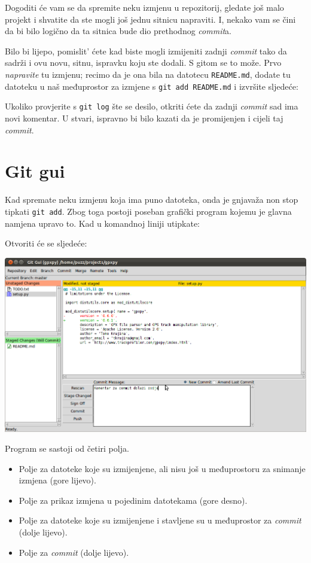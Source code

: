 Dogoditi će vam se da spremite neku izmjenu u repozitorij, gledate još malo projekt i shvatite da ste mogli još jednu sitnicu napraviti.
I, nekako vam se čini da bi bilo logično da ta sitnica bude dio prethodnog \emph{commit}a.

Bilo bi lijepo, pomislit' ćete kad biste mogli izmijeniti zadnji \emph{commit} tako da sadrži i ovu novu, sitnu, ispravku koju ste dodali.
S gitom se to može.
Prvo \emph{napravite} tu izmjenu; recimo da je ona bila na datotecu \verb+README.md+, dodate tu datoteku u naš međuprostor za izmjene s \verb+git add README.md+ i izvršite sljedeće:


Ukoliko provjerite s \verb+git log+ šte se desilo, otkriti ćete da zadnji \emph{commit} sad ima novi komentar.
U stvari, ispravno bi bilo kazati da je promijenjen i cijeli taj \emph{commit}.

\section*{Git gui}

Kad spremate neku izmjenu koja ima puno datoteka, onda je gnjavaža non stop tipkati \verb+git add+.
Zbog toga postoji poseban grafički program kojemu je glavna namjena upravo to.
Kad u komandnoj liniji utipkate:


Otvoriti će se sljedeće:

\includegraphics[width=14cm]{images/git-gui.png}

Program se sastoji od četiri polja. 

\begin{itemize}
	\item Polje za datoteke koje su izmijenjene, ali nisu još u međuprostoru za snimanje izmjena (gore lijevo).
	\item Polje za prikaz izmjena u pojedinim datotekama (gore desno). 
	\item Polje za datoteke koje su izmijenjene i stavljene su u međuprostor za \emph{commit} (dolje lijevo).
	\item Polje za \emph{commit} (dolje lijevo).
\end{itemize}

